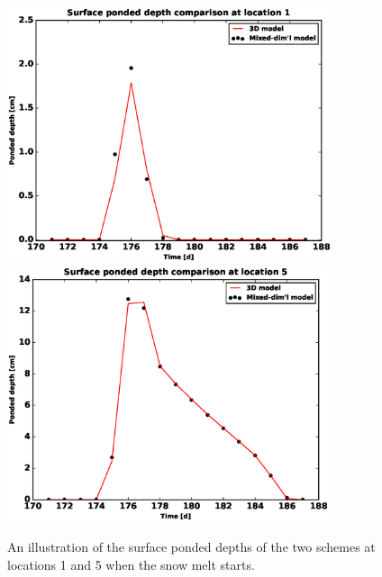\documentclass[review,11pt]{elsarticle}
\begin{document}
\begin{figure}[!htpb]
\centering
\includegraphics[height = 7.5cm, width=6.cm]{figures/comparison/regular/ponded-depth/comp-pd-location1.eps}
\includegraphics[height = 7.5cm, width=6.cm]{figures/comparison/regular/ponded-depth/comp-pd-location5.eps}
\caption{An illustration of the surface ponded depths of the two schemes at locations 1 and 5 when the snow melt starts.}
\label{surf-pd-comp}
\end{figure}
\end{document}
